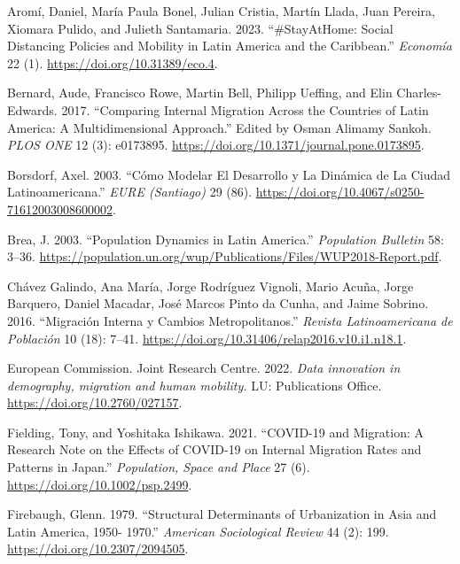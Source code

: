 \documentclass[
  10pt,
  letterpaper,
  DIV=11,
  numbers=noendperiod]{scrartcl}
\newlength{\cslhangindent}
\newlength{\cslentryspacingunit} %
\newenvironment{CSLReferences}[2] %
 {%
  \setlength{\parindent}{0pt}
  \ifodd #1
  \let\oldpar\par
  \def\par{\hangindent=\cslhangindent\oldpar}
  \fi
  \setlength{\parskip}{#2\cslentryspacingunit}
 }%
 {}
\begin{document}
\hypertarget{refs}{}
\begin{CSLReferences}{1}{0}
\leavevmode{}%
Aromí, Daniel, María Paula Bonel, Julian Cristia, Martín Llada, Juan
Pereira, Xiomara Pulido, and Julieth Santamaria. 2023. {``\#StayAtHome:
Social Distancing Policies and Mobility in Latin America and the
Caribbean.''} \emph{Economía} 22 (1).
\url{https://doi.org/10.31389/eco.4}.

\leavevmode{}%
Bernard, Aude, Francisco Rowe, Martin Bell, Philipp Ueffing, and Elin
Charles-Edwards. 2017. {``Comparing Internal Migration Across the
Countries of Latin America: A Multidimensional Approach.''} Edited by
Osman Alimamy Sankoh. \emph{PLOS ONE} 12 (3): e0173895.
\url{https://doi.org/10.1371/journal.pone.0173895}.

\leavevmode{}%
Borsdorf, Axel. 2003. {``Cómo Modelar El Desarrollo y La Dinámica de La
Ciudad Latinoamericana.''} \emph{EURE (Santiago)} 29 (86).
\url{https://doi.org/10.4067/s0250-71612003008600002}.

\leavevmode{}%
Brea, J. 2003. {``Population Dynamics in Latin America.''}
\emph{Population Bulletin} 58: 3--36.
\url{https://population.un.org/wup/Publications/Files/WUP2018-Report.pdf}.

\leavevmode{}%
Chávez Galindo, Ana María, Jorge Rodríguez Vignoli, Mario Acuña, Jorge
Barquero, Daniel Macadar, José Marcos Pinto da Cunha, and Jaime Sobrino.
2016. {``Migración Interna y Cambios Metropolitanos.''} \emph{Revista
Latinoamericana de Población} 10 (18): 7--41.
\url{https://doi.org/10.31406/relap2016.v10.i1.n18.1}.

\leavevmode{}%
European Commission. Joint Research Centre. 2022. \emph{Data innovation
in demography, migration and human mobility.} LU: Publications Office.
\url{https://doi.org/10.2760/027157}.

\leavevmode{}%
Fielding, Tony, and Yoshitaka Ishikawa. 2021. {``COVID{-}19 and
Migration: A Research Note on the Effects of COVID{-}19 on Internal
Migration Rates and Patterns in Japan.''} \emph{Population, Space and
Place} 27 (6). \url{https://doi.org/10.1002/psp.2499}.

\leavevmode{}%
Firebaugh, Glenn. 1979. {``Structural Determinants of Urbanization in
Asia and Latin America, 1950- 1970.''} \emph{American Sociological
Review} 44 (2): 199. \url{https://doi.org/10.2307/2094505}.


\end{CSLReferences}
\end{document}

